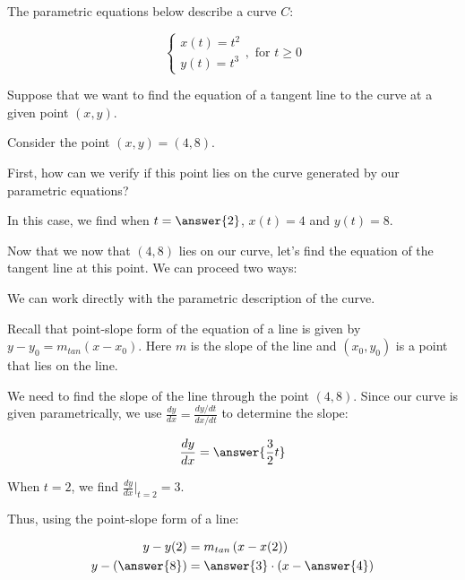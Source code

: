 \documentclass{ximera}
\author{Jim Talamo and Jason Miller}
\begin{document}
\begin{exercise}
The parametric equations below describe a curve $C$: 

\[
\begin{cases}
x(t) = t^2\\
y(t) = t^3
\end{cases} , \textrm{ for } t \geq 0
\]

Suppose that we want to find the equation of a tangent line to the curve at a given point $(x,y)$.  

Consider the point $(x,y) = (4,8)$.  

First, how can we verify if this point lies on the curve generated by our parametric equations? 

\begin{multipleChoice}
\end{multipleChoice}

In this case, we find when $t=\answer{2}$, $x(t) = 4$ and $y(t) =8$. 

Now that we now that $(4,8)$ lies on our curve, let's find the equation of the tangent line at this point.  We can proceed two ways:
\begin{exercise}
We can work directly with the parametric description of the curve.

Recall that point-slope form of the equation of a line is given by $y-y_{0}=m_{tan}(x-x_{0})$. Here $m$ is the slope of the line and $(x_{0}, y_{0})$ is a point that lies on the line. 

We need to find the slope of the line through the point $(4,8)$. Since our curve is given parametrically, we use $\frac{dy}{dx}=\frac{dy/dt}{dx/dt}$ to determine the slope:

\[ \frac{dy}{dx}=\answer{\frac{3}{2}t} \] 

When $t=2$, we find $\frac{dy}{dx} \bigg|_{t=2}= 3$.  

Thus, using the point-slope form of a line:

\begin{align*}
y-y(2)& = m_{tan}\left(x-x(2)\right) \\
y-\left(\answer{8}\right)& =\answer{3} \cdot \left(x-\answer{4}\right) \\
\end{align*}


\end{exercise}
\end{exercise}
\end{document}

